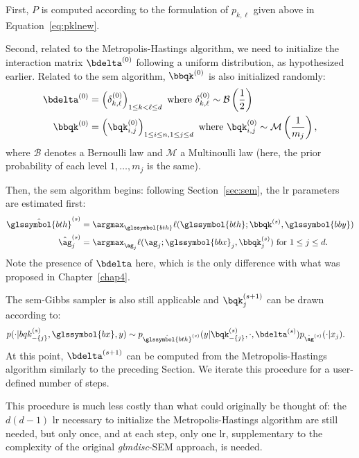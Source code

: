 First, $P$ is computed according to the formulation of $p_{k,\ell}$ given above in Equation~\eqref{eq:pklnew}.

Second, related to the Metropolis-Hastings algorithm, we need to initialize the interaction matrix $\bdelta^{(0)}$ following a uniform distribution, as hypothesized earlier. Related to the \gls{sem} algorithm, $\bbqk^{(0)}$ is also initialized randomly:
\begin{align*}
\bdelta^{(0)} & = \left( \delta^{(0)}_{k,\ell} \right)_{1 \leq k < \ell \leq d} \text{ where } \delta^{(0)}_{k,\ell} \sim \mathcal{B} \left( \frac{1}{2} \right) \\
\bbqk^{(0)} & = \left( \bqk^{(0)}_{i,j} \right)_{1 \leq i \leq n, 1 \leq j \leq d} \text{ where } \bqk^{(0)}_{i,j} \sim \mathcal{M} \left( \frac{1}{m_j} \right),
\end{align*}
where $\mathcal{B}$ denotes a Bernoulli law and $\mathcal{M}$ a Multinoulli law (here, the prior probability of each level $1, \dots, m_j$ is the same).

Then, the \gls{sem} algorithm begins: following Section~\ref{sec:sem}, the \gls{lr} parameters are estimated first:
\begin{align*}
\hat{\glssymbol{bth}}^{(s)} & = \argmax_{\glssymbol{bth}} \ell(\glssymbol{bth} ; \bbqk^{(s)}, \glssymbol{bby}) \\
\hat{\ag}_j^{(s)} & = \argmax_{\ag_j} \ell(\ag_j ; \glssymbol{bbx}_j, \bbqk^{(s)}_j) \text{ for } 1 \leq j \leq d.
\end{align*}
Note the presence of $\bdelta$ here, which is the only difference with what was proposed in Chapter~\ref{chap4}.

The \gls{sem}-Gibbs sampler is also still applicable and $\bqk_j^{(s+1)}$ can be drawn according to: 
\begin{align*}
p(\cdot | bqk_{-\{j\}}^{(s)}, \glssymbol{bx}, y) & \sim p_{\hat{\glssymbol{bth}}^{(s)}}(y | \bqk_{-\{j\}}^{(s)}, \cdot, \bdelta^{(s)}) p_{\hat{\ag}^{(s)}}(\cdot | x_j).
\end{align*}
At this point, $\bdelta^{(s+1)}$ can be computed from the Metropolis-Hastings algorithm similarly to the preceding Section. We iterate this procedure for a user-defined number of steps.

This procedure is much less costly than what could originally be thought of: the $d(d-1)$ \gls{lr} necessary to initialize the Metropolis-Hastings algorithm are still needed, but only once, and at each step, only one \gls{lr}, supplementary to the complexity of the original \textit{glmdisc}-SEM approach, is needed.

